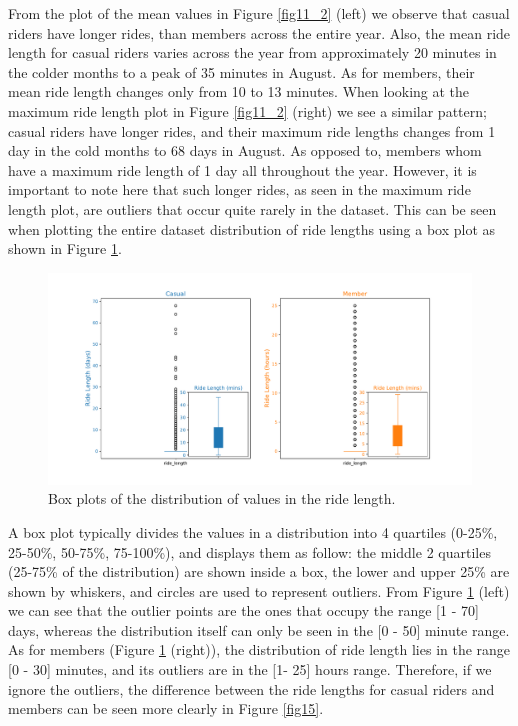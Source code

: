 \documentclass[12pt]{article}
\begin{document}
\begin{itemize}
From the plot of the mean values in Figure \ref{fig11_2} (left) we observe that casual riders have longer rides, than members across the entire year. Also, the mean ride length for casual riders varies across the year from approximately 20 minutes in the colder months to a peak of 35 minutes in August. As for members, their mean ride length changes only from 10 to 13 minutes. When looking at the maximum ride length plot in Figure \ref{fig11_2} (right) we see a similar pattern; casual riders have longer rides, and their maximum ride lengths changes from 1 day in the cold months to 68 days in August. As opposed to, members whom have a maximum ride length of 1 day all throughout the year. However, it is important to note here that such longer rides, as seen in the maximum ride length plot, are outliers that occur quite rarely in the dataset. This can be seen when plotting the entire dataset distribution of ride lengths using a box plot as shown in Figure \ref{fig13}.  
\pagebreak
	\begin{figure}[h]
	\centering
	\includegraphics[scale=0.5]{boxplot_distribution.pdf} 
	\caption{Box plots of the distribution of values in the ride length.}
	\label{fig13}
	\end{figure}
	
A box plot typically divides the values in a distribution into 4 quartiles (0-25\%, 25-50\%, 50-75\%, 75-100\%), and displays them as follow: the middle 2 quartiles (25-75\% of the distribution) are shown inside a box, the lower and upper 25\% are shown by whiskers, and circles are used to represent outliers. From Figure \ref{fig13} (left) we can see that the outlier points are the ones that occupy the range [1 - 70] days, whereas the distribution itself can only be seen in the [0 - 50] minute range. As for members (Figure \ref{fig13} (right)), the distribution of ride length lies in the range [0 - 30] minutes, and its outliers are in the [1- 25] hours range. Therefore, if we ignore the outliers, the difference between the ride lengths for casual riders and members can be seen more clearly in Figure \ref{fig15}.


\end{itemize}
\end{document}
